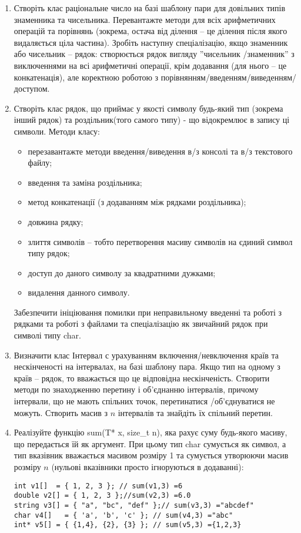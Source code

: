 \documentclass[]{article}
\begin{document}
\begin{enumerate}
\item
Створіть клас раціональне число на базі шаблону пари для довільних типів знаменника та чисельника.
Перевантажте методи для всіх арифметичних операцій та порівнянь
(зокрема, остача від ділення -- це ділення після якого видаляється ціла частина).
Зробіть наступну спеціалізацію, якщо знаменник або чисельник -- рядок:
створюється рядок вигляду ''{чисельник} /{знаменник}'' з виключеннями на всі арифметичні операції,
крім додавання (для нього -- це конкатенація), але коректною роботою з
порівнянням/введенням/виведенням/доступом.

\item
Створіть клас рядок, що приймає у якості символу будь-який тип (зокрема інший рядок)
та роздільник(того самого типу) - що відокремлює в запису ці символи.
Методи класу:
\begin{itemize}
\item
перезавантажте методи введення/виведення в/з консолі та в/з текстового файлу;
\item
введення та заміна роздільника;
\item
метод конкатенації (з додаванням між рядками роздільника);
\item
довжина рядку;
\item
злиття символів -- тобто перетворення масиву символів на єдиний символ типу рядок;
\item
доступ до даного символу за квадратними дужками;
\item
видалення данного символу.
\end{itemize}
Забезпечити ініціювання помилки при неправильному введенні та роботі з рядками
та роботі з файлами та спеціалізацію як звичайний рядок при символі типу char.

\item
Визначити клас Інтервал с урахуванням включення/невключення країв та нескінченості на інтервалах,
на базі шаблону пара. Якщо тип на одному з країв -- рядок, то вважається
що це відповідна нескінченість.  
Створити методи по знаходженню перетину і об'єднанню інтервалів,
причому інтервали, що не мають спільних точок, перетинатися /об'єднуватися не можуть.
Створить масив з $n$ інтервалів та знайдіть їх спільний перетин.
 
\item
Реалізуйте функцію sum(T* x, size\_t n), яка рахує суму будь-якого масиву, що передається їй як аргумент.
При цьому тип char сумується як символ, а тип вказівник вважається масивом розміру 1 та сумується утворюючи
масив розміру $n$ (нульові вказівники просто ігноруються в додаванні):
\begin{verbatim}
int v1[]  = { 1, 2, 3 }; // sum(v1,3) =6
double v2[] = { 1, 2, 3 };//sum(v2,3) =6.0
string v3[] = { "a", "bc", "def" };// sum(v3,3) ="abcdef"
char v4[]   = { 'a', 'b', 'c' }; // sum(v4,3) ="abc"
int* v5[] = { {1,4}, {2}, {3} }; // sum(v5,3) ={1,2,3}
\end{verbatim}


\end{enumerate}
\end{document}

